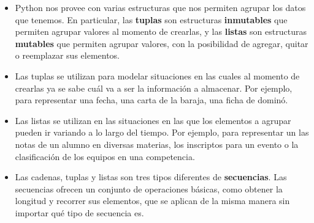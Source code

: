 \begin{itemize}

\item Python nos provee con varias estructuras que nos permiten agrupar los
datos que tenemos.  En particular, las {\bf tuplas} son estructuras
{\bf inmutables} que permiten agrupar valores al momento de crearlas, y las {\bf
listas} son estructuras {\bf mutables} que permiten agrupar valores, con la
posibilidad de agregar, quitar o reemplazar sus elementos.

\item Las tuplas se utilizan para modelar situaciones en las cuales al
momento de crearlas ya se sabe cuál va a ser la información a almacenar.
Por ejemplo, para representar una fecha, una carta de la baraja, una ficha
de dominó.

\item Las listas se utilizan en las situaciones en las que los elementos a
agrupar pueden ir variando a lo largo del tiempo.  Por ejemplo, para
representar un las notas de un alumno en diversas materias, los inscriptos
para un evento o la clasificación de los equipos en una competencia.

\item Las cadenas, tuplas y listas son tres tipos diferentes de {\bf
secuencias}. Las secuencias ofrecen un conjunto de operaciones básicas, como
obtener la longitud y recorrer sus elementos, que se aplican de la misma manera
sin importar qué tipo de secuencia es.

\end{itemize}

